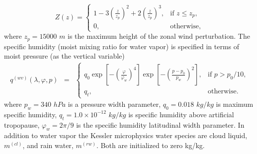 \documentclass{agujournal}
\begin{document}
\begin{equation}
Z(z) = \left\{ \begin{array}{ll} \displaystyle 1 - 3 \left( \frac{z}{z_p} \right)^2 + 2 \left( \frac{z}{z_p} \right)^3, & \mbox{if $z \leq z_p$,} \\ 0, & \mbox{otherwise,} \end{array} \right.
\end{equation}
where $z_p=15000$ $m$ is the maximum height of the zonal wind perturbation. The specific humidity (moist mixing ratio for water vapor) is specified in terms of moist pressure (as the vertical variable)
\begin{eqnarray}
q^{(wv)}(\lambda, \varphi, p) &=& \left\{ \begin{array}{ll} q_0 \exp\left[- \left(\frac{\varphi}{\varphi_{w}}\right)^4 \right] \exp\left[- \left(\frac{p-p_0}{p_{w}}\right)^2  \right], & \mbox{if $p > p_0 / 10$,} \\ q_{t}, & \mbox{otherwise.} \end{array} \right.
\end{eqnarray} 
where $p_w=340$ $hPa$ is a pressure width parameter, $q_0=0.018$ $kg/kg$ is maximum specific humidity, $q_t=1.0\times 10^{-12}$ $kg/kg$ is specific humidity above artificial tropopause, $\varphi_{w}=2\pi/9$ is the specific humidity latitudinal width parameter. In addition to water vapor the Kessler microphysics water species are cloud liquid, $m^{(cl)}$, and rain water, $m^{(rw)}$. Both are initialized to zero kg/kg.


%
%

%
\end{document}
